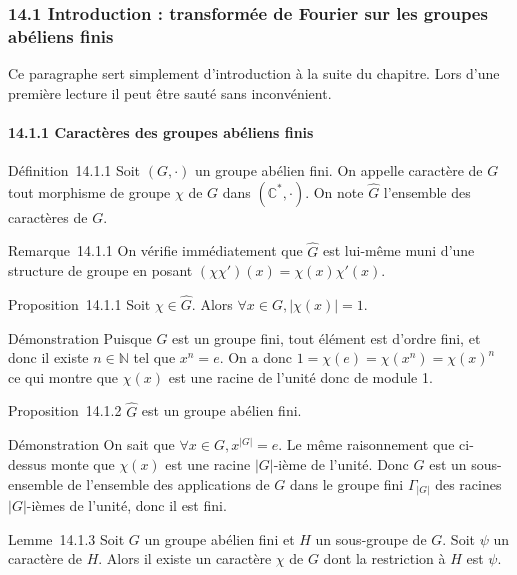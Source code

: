 \subsubsection{14.1 Introduction : transformée de Fourier sur les groupes abéliens finis}

Ce paragraphe sert simplement d'introduction à la suite du chapitre.
Lors d'une première lecture il peut être sauté sans inconvénient.

\paragraph{14.1.1 Caractères des groupes abéliens finis}

Définition~14.1.1 Soit $(G,\cdot)$ un groupe abélien fini. On appelle
caractère de $G$ tout morphisme de groupe $\chi$ de $G$ dans $(\mathbb{C}^*, \cdot)$.
On note $\hat{G}$ l'ensemble des caractères de $G$.

Remarque~14.1.1 On vérifie immédiatement que $\hat{G}$
est lui-même muni d'une structure de groupe en posant $(\chi \chi')(x) =
\chi(x)\chi'(x)$.

Proposition~14.1.1 Soit $\chi \in \hat{G}$. Alors
$\forall x \in G, |\chi(x)| = 1$.

Démonstration Puisque $G$ est un groupe fini, tout élément est d'ordre
fini, et donc il existe $n \in \mathbb{N}$ tel que $x^n = e$. On a donc $1 =
\chi(e) = \chi(x^n) = \chi(x)^n$ ce qui montre que $\chi(x)$ est
une racine de l'unité donc de module 1.

Proposition~14.1.2 $\hat{G}$ est un groupe abélien fini.

Démonstration On sait que $\forall x \in G,
x^{|G|} = e$. Le même raisonnement que ci-dessus monte que $\chi(x)$ est une racine $|G|$-ième de
l'unité. Donc $\hat{G}$ est un sous-ensemble de
l'ensemble des applications de $G$ dans le groupe fini
$\Gamma_{|G|}$ des racines $|G|$-ièmes
de l'unité, donc il est fini.

Lemme~14.1.3 Soit $G$ un groupe abélien fini et $H$ un sous-groupe de $G$.
Soit $\psi$ un caractère de $H$. Alors il existe un caractère $\chi$ de $G$ dont la
restriction à $H$ est $\psi$.

